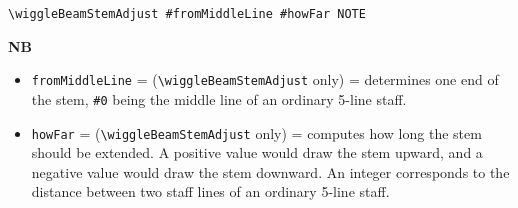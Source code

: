 \documentclass[11pt, oneside]{book}   	%
\begin{document}
\hrulefill
\begin{verbatim}
\wiggleBeamStemAdjust #fromMiddleLine #howFar NOTE
\end{verbatim}
\textbf{NB} 
\begin{itemize}
\item \verb|fromMiddleLine| = (\verb|\wiggleBeamStemAdjust| only) = determines one end of the stem, \verb|#0| being the middle line of an ordinary 5-line staff. 
\item \verb|howFar| = (\verb|\wiggleBeamStemAdjust| only) = computes how long the stem should be extended. A positive value would draw the stem upward, and a negative value would draw the stem downward. An integer corresponds to the distance between two staff lines of an ordinary 5-line staff.
\end{itemize}
\end{document}
